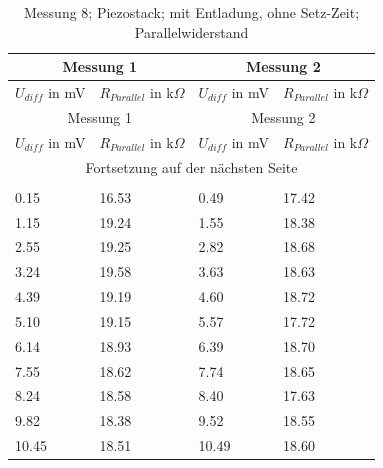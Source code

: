 \documentclass[12pt]{scrreprt} %
\begin{document}
\setlongtables
\begin{longtable}{| l | l | l | l |}
\hline
\multicolumn{2}{|c|}{Messung 1} &\multicolumn{2}{|c|}{Messung 2}\\
\hline
$U_{diff}$ in mV&$R_{Parallel}$ in k$\Omega$&$U_{diff}$ in mV&$R_{Parallel}$ in k$\Omega$\\
\hline
\endfirsthead
\hline
\multicolumn{2}{|c|}{Messung 1} &\multicolumn{2}{|c|}{Messung 2}\\
\hline
$U_{diff}$ in mV&$R_{Parallel}$ in k$\Omega$&$U_{diff}$ in mV&$R_{Parallel}$ in k$\Omega$\\
\hline
\endhead
\hline
\multicolumn{4}{|c|}{Fortsetzung auf der nächsten Seite}\\
\hline
\endfoot
\hline \hline
\caption[Messung 8; ohne Setz-Zeit; Parallelwiderstand]{Messung 8; Piezostack; mit Entladung, ohne Setz-Zeit; Parallelwiderstand}\\
\endlastfoot
\hline
\label{tab:2.8}%
0.15&16.53&0.49&17.42\\
1.15&19.24&1.55&18.38\\
2.55&19.25&2.82&18.68\\
3.24&19.58&3.63&18.63\\
4.39&19.19&4.60&18.72\\
5.10&19.15&5.57&17.72\\
6.14&18.93&6.39&18.70\\
7.55&18.62&7.74&18.65\\
8.24&18.58&8.40&17.63\\
9.82&18.38&9.52&18.55\\
10.45&18.51&10.49&18.60\\
\end{longtable}
\end{document}
